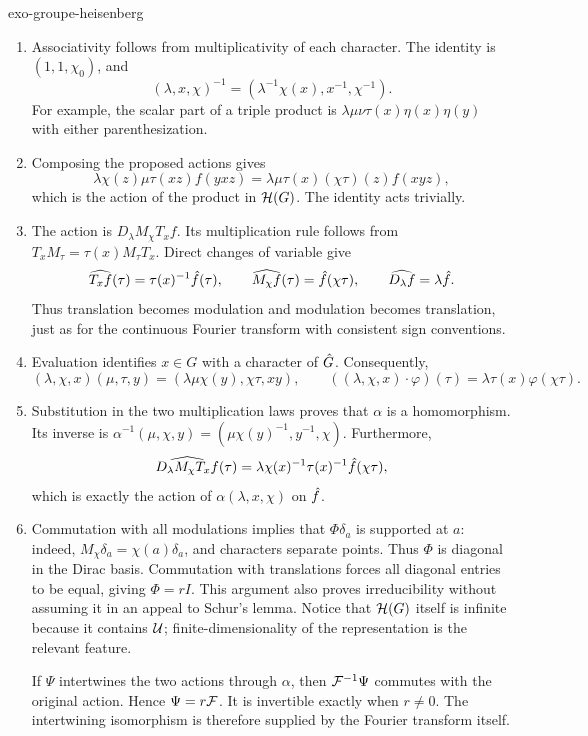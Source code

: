 \begin{correction}{exo-groupe-heisenberg}
\begin{enumerate}
\item Associativity follows from multiplicativity of each character.
The identity is $(1,1,\chi_0)$, and
\[
 (\lambda,x,\chi)^{-1}
 =(\lambda^{-1}\chi(x),x^{-1},\chi^{-1}).
\]
For example, the scalar part of a triple product is
$\lambda\mu\nu\tau(x)\eta(x)\eta(y)$ with either parenthesization.
\item Composing the proposed actions gives
\[
 \lambda\chi(z)\mu\tau(xz)f(yxz)
 =\lambda\mu\tau(x)(\chi\tau)(z)f(xyz),
\]
which is the action of the product in $\mathcal{H}(G)$. The identity acts trivially.
\item The action is $D_\lambda M_\chi T_x f$. Its multiplication rule follows
from $T_xM_\tau=\tau(x)M_\tau T_x$. Direct changes of variable give
\[
 \widehat{T_xf}(\tau)=\tau(x)^{-1}\hat{f}(\tau),\qquad
 \widehat{M_\chi f}(\tau)=\hat{f}(\chi\tau),\qquad
 \widehat{D_\lambda f}=\lambda\hat{f}.
\]
Thus translation becomes modulation and modulation becomes translation, just
as for the continuous Fourier transform with consistent sign conventions.
\item Evaluation identifies $x\in G$ with a character of $\hat{G}$.
Consequently,
\[
 (\lambda,\chi,x)(\mu,\tau,y)
 =(\lambda\mu\chi(y),\chi\tau,xy),\qquad
 ((\lambda,\chi,x)\cdot\varphi)(\tau)
 =\lambda\tau(x)\varphi(\chi\tau).
\]
\item Substitution in the two multiplication laws proves that $\alpha$ is a
homomorphism. Its inverse is
$\alpha^{-1}(\mu,\chi,y)=(\mu\chi(y)^{-1},y^{-1},\chi)$.
Furthermore,
\[
 \widehat{D_\lambda M_\chi T_xf}(\tau)
 =\lambda\chi(x)^{-1}\tau(x)^{-1}\hat{f}(\chi\tau),
\]
which is exactly the action of $\alpha(\lambda,x,\chi)$ on $\hat{f}$.
\item Commutation with all modulations implies that $\Phi\delta_a$ is supported
at $a$: indeed, $M_\chi\delta_a=\chi(a)\delta_a$, and characters separate
points. Thus $\Phi$ is diagonal in the Dirac basis. Commutation with
translations forces all diagonal entries to be equal, giving $\Phi=rI$.
This argument also proves irreducibility without assuming it in an appeal
to Schur's lemma. Notice that $\mathcal{H}(G)$ itself is infinite because it contains
$\mathcal{U}$; finite-dimensionality of the representation is the relevant feature.

If $\Psi$ intertwines the two actions through $\alpha$, then
$\mathcal{F}^{-1}\Psi$ commutes with the original action. Hence $\Psi=r\mathcal{F}$.
It is invertible exactly when $r\neq0$. The intertwining isomorphism is
therefore supplied by the Fourier transform itself.
\end{enumerate}
\end{correction}

